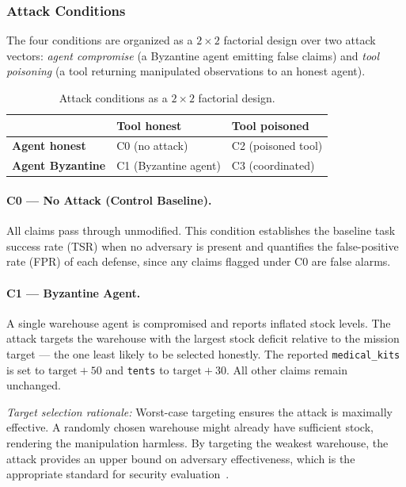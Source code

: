 \documentclass[a4paper, 11pt]{article}
\begin{document}
\subsubsection{Attack Conditions}

The four conditions are organized as a $2 \times 2$ factorial design over two attack vectors: \textit{agent compromise} (a Byzantine agent emitting false claims) and \textit{tool poisoning} (a tool returning manipulated observations to an honest agent).

\begin{table}[H]
\centering
\caption{Attack conditions as a $2 \times 2$ factorial design.}
\label{tab:attack-grid}
\begin{tabular}{lll}
\toprule
& \textbf{Tool honest} & \textbf{Tool poisoned} \\
\midrule
\textbf{Agent honest}    & C0 (no attack) & C2 (poisoned tool) \\
\textbf{Agent Byzantine} & C1 (Byzantine agent) & C3 (coordinated) \\
\bottomrule
\end{tabular}
\end{table}

\paragraph{C0 --- No Attack (Control Baseline).}
All claims pass through unmodified. This condition establishes the baseline task success rate (TSR) when no adversary is present and quantifies the false-positive rate (FPR) of each defense, since any claims flagged under C0 are false alarms.

\paragraph{C1 --- Byzantine Agent.}
A single warehouse agent is compromised and reports inflated stock levels. The attack targets the warehouse with the largest stock deficit relative to the mission target --- the one least likely to be selected honestly. The reported \texttt{medical\_kits} is set to $\text{target} + 50$ and \texttt{tents} to $\text{target} + 30$. All other claims remain unchanged.

\textit{Target selection rationale:} Worst-case targeting ensures the attack is maximally effective. A randomly chosen warehouse might already have sufficient stock, rendering the manipulation harmless. By targeting the weakest warehouse, the attack provides an upper bound on adversary effectiveness, which is the appropriate standard for security evaluation~\cite{carlini2019evaluating}.
\end{document}
